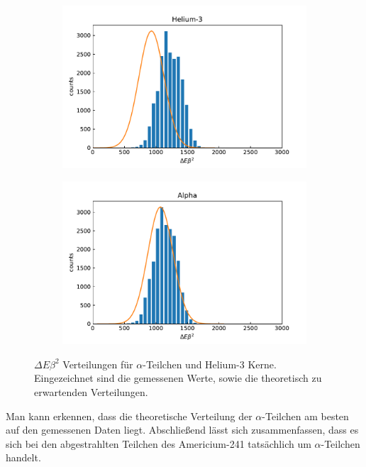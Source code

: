 \begin{figure}[ht]
	\centering
	\begin{subfigure}[c]{0.45\textwidth}
		\centering
		\includegraphics[width=\textwidth]{dat/debeta_Helium-3.pdf}
	\end{subfigure}
	\begin{subfigure}[c]{0.45\textwidth}
		\centering
		\includegraphics[width=\textwidth]{dat/debeta_Alpha.pdf}
	\end{subfigure}
	\caption{$\Delta E \beta^2$ Verteilungen für $\alpha$-Teilchen und Helium-3 Kerne. Eingezeichnet sind die gemessenen Werte, sowie die theoretisch zu erwartenden Verteilungen.}
	\label{fig:debeta}
\end{figure}

Man kann erkennen, dass die theoretische Verteilung der $\alpha$-Teilchen am besten auf den gemessenen Daten liegt.
Abschließend lässt sich zusammenfassen, dass es sich bei den abgestrahlten Teilchen des Americium-241 tatsächlich um $\alpha$-Teilchen handelt.
